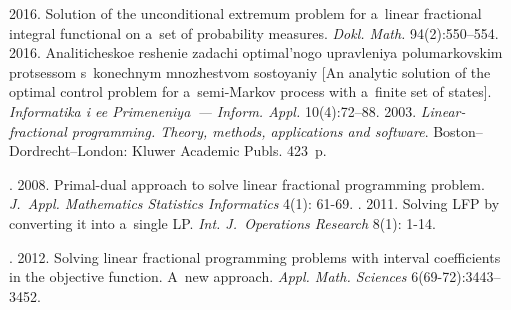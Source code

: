  \begin{multicols}{2}

\renewcommand{\bibname}{\protect\rmfamily References}

{\small\frenchspacing
 {%
 \begin{thebibliography}{99}

 2016. Solution of the unconditional extremum problem for a~linear fractional 
integral functional on a~set of probability measures. \textit{Dokl. Math.} 94(2):550--554.
 2016. Analiticheskoe reshenie zadachi 
optimal'nogo upravleniya polumarkovskim protsessom s~konechnym mnozhestvom sostoyaniy [An analytic 
solution of the optimal control problem for a~semi-Markov process with a~finite set of states]. 
\textit{Informatika i ee Primeneniya~--- Inform. Appl.} 10(4):72--88.
 2003. \textit{Linear-fractional programming. Theory, methods, applications and 
software}. Boston--Dordrecht--London: Kluwer Academic Publs. 423~p.

. 2008. Primal-dual approach to solve linear fractional 
programming problem. \textit{J.~Appl. Mathematics Statistics Informatics} 4(1): 61-69.
. 2011. Solving LFP by converting
 it into a~single LP. \textit{Int. J.~Operations Research} 8(1): 1-14.
 
. 2012. Solving linear fractional programming problems 
with interval coefficients in the objective function. A~new approach. 
\textit{Appl. Math. Sciences}  
6(69-72):3443--3452.


\end{thebibliography}}}
\end{multicols}
